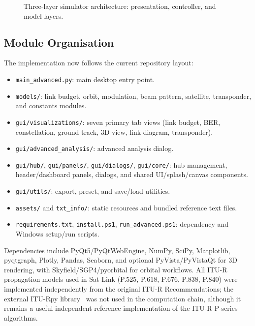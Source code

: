 \documentclass[telecom,article,submit,pdftex,moreauthors]{Definitions/mdpi}
\begin{document}
\begin{figure}[!t]
\caption{Three-layer simulator architecture: presentation, controller,
  and model layers.}
\label{fig:arch}
\end{figure}

\subsection{Module Organisation}

The implementation now follows the current repository layout:
\begin{itemize}[leftmargin=*,nosep]
  \item \texttt{main\_advanced.py}: main desktop entry point.
  \item \texttt{models/}: link budget, orbit, modulation, beam pattern,
        satellite, transponder, and constants modules.
  \item \texttt{gui/visualizations/}: seven primary tab views
        (link budget, BER, constellation, ground track, 3D view,
        link diagram, transponder).
  \item \texttt{gui/advanced\_analysis/}: advanced analysis dialog.
  \item \texttt{gui/hub/}, \texttt{gui/panels/}, \texttt{gui/dialogs/},
        \texttt{gui/core/}: hub management, header/dashboard panels,
        dialogs, and shared UI/splash/canvas components.
  \item \texttt{gui/utils/}: export, preset, and save/load utilities.
  \item \texttt{assets/} and \texttt{txt\_info/}: static resources and
        bundled reference text files.
  \item \texttt{requirements.txt}, \texttt{install.ps1},
        \texttt{run\_advanced.ps1}: dependency and Windows setup/run scripts.
\end{itemize}

Dependencies include PyQt5/PyQtWebEngine, NumPy, SciPy, Matplotlib,
pyqtgraph, Plotly, Pandas, Seaborn, and optional PyVista/PyVistaQt for
3D rendering, with Skyfield/SGP4/pyorbital for orbital workflows.
All ITU-R propagation models used in Sat-Link (P.525, P.618, P.676, P.838, P.840) were implemented independently from the original ITU-R Recommendations; the external ITU-Rpy library~\cite{iturpy} was not used in the computation chain, although it remains a useful independent reference implementation of the ITU-R P-series algorithms.
\end{document}
